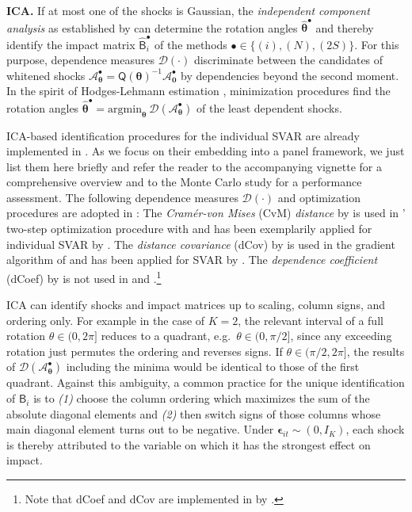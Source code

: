 \textbf{ICA.} If at most one of the shocks is Gaussian, the \textit{independent component analysis} as established by \citet{Comon1994} can determine the rotation angles $ \boldsymbol{\widehat{\theta}}^{\bullet} $ and thereby identify the impact matrix $ \widehat{\mathsf{B}}_i^{\bullet} $ of the methods $ \bullet \in \lbrace (i), (N), (2S) \rbrace $. For this purpose, dependence measures $ \mathcal{D}(\cdot) $ discriminate between the candidates of whitened shocks $ \mathcal{A}_{\boldsymbol{\theta}}^{\bullet} = \mathsf{Q} \left( \boldsymbol{\theta} \right)^{-1} \mathcal{A}_{\boldsymbol{0}}^{\bullet} $ by dependencies beyond the second moment. In the spirit of Hodges-Lehmann estimation \citeyearpar{HodgesLehmann1963}, minimization procedures find the rotation angles $ \boldsymbol{\widehat{\theta}}^{\bullet} = \text{argmin}_{\boldsymbol{\theta}} \ \mathcal{D} \left( \mathcal{A}_{\boldsymbol{\theta}}^{\bullet} \right) $ of the least dependent shocks. 

ICA-based identification procedures for the individual SVAR are already implemented in . As we focus on their embedding into a panel framework, we just list them here briefly and refer the reader to the accompanying vignette \citep{LangeEtAl_fc} for a comprehensive overview and to the Monte Carlo study \citep{HerwartzEtAl2021} for a performance assessment. The following dependence measures $ \mathcal{D}\left( \cdot \right) $ and optimization procedures are adopted in : The \textit{Cramér-von Mises} (CvM) \textit{distance} by \citet{GenestEtAl2007} is used in ' two-step optimization procedure with  \citep{KojadinovicYan2010} and has been exemplarily applied for individual SVAR by \citet{Herwartz2018}. The \textit{distance covariance} (dCov) by \citet{Szekely2007} is used in the gradient algorithm of  \citep{RiskEtAl2015} and has been applied for SVAR by \citet{MattesonTsay2017}. The \textit{dependence coefficient} (dCoef) by \citet{BakirovEtAl2006} is not used in  and .\footnote{Note that dCoef and dCov are implemented in  by \citet{RizzoSzekely2022}.} 

ICA can identify shocks and impact matrices up to scaling, column signs, and ordering only. For example in the case of $ K=2 $, the relevant interval of a full rotation $ \theta \in (0, 2\pi] $ reduces to a quadrant, e.g.~$ \theta \in (0, \pi/2] $, since any exceeding rotation just permutes the ordering and reverses signs. If $ \theta \in (\pi/2, 2\pi] $, the results of $ \mathcal{D} \left( \mathcal{A}_{\boldsymbol{\theta}}^{\bullet} \right) $ including the minima would be identical to those of the first quadrant. Against this ambiguity, a common practice for the unique identification of $ \mathsf{B}_i $ is to \textit{(1)} choose the column ordering which maximizes the sum of the absolute diagonal elements and \textit{(2)} then switch signs of those columns whose main diagonal element turns out to be negative. Under $ \boldsymbol{\epsilon}_{it} \sim ( 0, I_K ) $, each shock is thereby attributed to the variable on which it has the strongest effect on impact.


